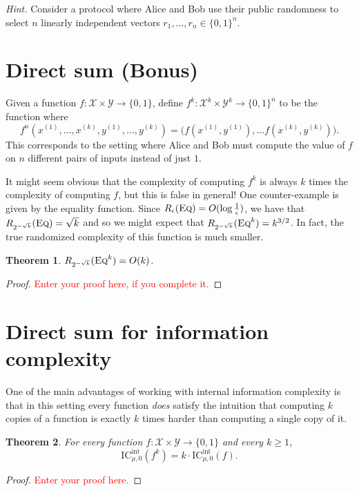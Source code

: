 \documentclass[11pt]{amsart}
\theoremstyle{plain}
\newtheorem{theorem}{Theorem}
\theoremstyle{definition}
\theoremstyle{plain}
\newcommand{\calX}{\mathcal{X}}
\newcommand{\calY}{\mathcal{Y}}
\newcommand{\Eq}{\textsc{Eq}}
\newcommand{\ICint}{\mathrm{IC}^{\mathrm{int}}}
\newcommand{\replacethistext}[1]{\textcolor{red}{#1}}
\begin{document}
\bigskip
\noindent \emph{Hint.} Consider a protocol where Alice and Bob use their public randomness to select $n$ linearly independent vectors $r_1,\ldots,r_n \in \{0,1\}^n$.


\newpage 
\section{Direct sum (Bonus)}

Given a function $f : \calX \times \calY \to \{0,1\}$, define $f^k : \calX^k \times \calY^k \to \{0,1\}^n$ to be the function where
\[
f^n(x^{(1)},\ldots,x^{(k)},y^{(1)},\ldots,y^{(k)}) = \big( f(x^{(1)},y^{(1)}), \ldots f(x^{(k)}, y^{(k)})\big).
\]
This corresponds to the setting where Alice and Bob must compute the value of $f$ on $n$ different pairs of inputs instead of just $1$.

It might seem obvious that the complexity of computing $f^k$ is always $k$ times the complexity of computing $f$, but this is false in general! One counter-example is given by the equality function. Since $R_\epsilon(\Eq) = O(\log \frac1\epsilon)$, we have that $R_{2^{-\sqrt{k}}}(\Eq) = \sqrt{k}$ and so we might expect that $R_{2^{-\sqrt{k}}}(\Eq^k) = k^{3/2}$. In fact, the true randomized complexity of this function is much smaller.

\begin{theorem}
$R_{2^{-\sqrt{k}}}(\Eq^k) = O(k)$.
\end{theorem}

\begin{proof}
\replacethistext{Enter your proof here, if you complete it.}
\end{proof}


\newpage 
\section{Direct sum for information complexity}

One of the main advantages of working with internal information complexity is that in this setting every function \emph{does} satisfy the intuition that computing $k$ copies of a function is exactly $k$ times harder than computing a single copy of it.
\begin{theorem}
For every function $f : \calX \times \calY \to \{0,1\}$ and every $k \ge 1$,
\[
\ICint_{\mu,0}(f^k) = k \cdot \ICint_{\mu,0}(f).
\]
\end{theorem}

\begin{proof}
\replacethistext{Enter your proof here.}
\end{proof}
\end{document}
